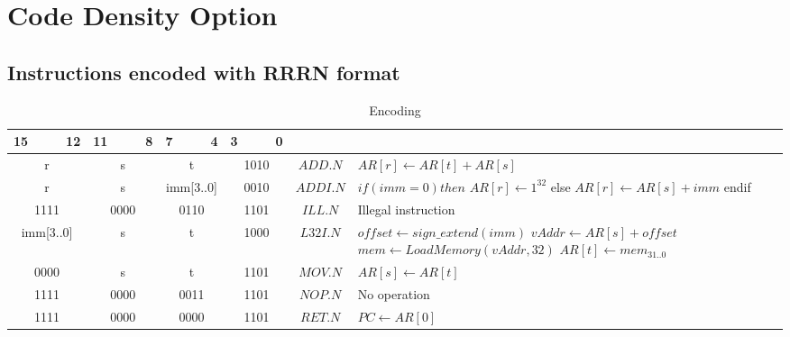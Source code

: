 \section{Code Density Option}
\subsection{Instructions encoded with RRRN format}
\begin{smalltables}
\begin{longtable}{llllllllllllllll  p{1cm}  p{7cm} | }
	\caption{Encoding\label{long}}\\
	15 & & & 12 & 11 & & & 8 & 7 & & & 4 & 3 & & & 0 & & \multicolumn{1}{c}{}\\
	\hline
	\endhead
	\multicolumn{4}{|c|}{r} & \multicolumn{4}{c|}{s} & \multicolumn{4}{c|}{t} & \multicolumn{4}{c|}{1010} & \multicolumn{1}{c|}{$ADD.N$} & $AR[r] \leftarrow AR[t] + AR[s]$ \\ \hline
	\multicolumn{4}{|c|}{r} & \multicolumn{4}{c|}{s} & \multicolumn{4}{c|}{imm[3..0]} & \multicolumn{4}{c|}{0010} & \multicolumn{1}{c|}{$ADDI.N$} & $if (imm = 0) then$ \newline $AR[r] \leftarrow 1^{32}$ \newline else \newline $AR[r] \leftarrow AR[s] + imm$ \newline endif \\ \hline
	\multicolumn{4}{|c|}{1111} & \multicolumn{4}{c|}{0000} & \multicolumn{4}{c|}{0110} & \multicolumn{4}{c|}{1101} & \multicolumn{1}{c|}{$ILL.N$} & Illegal instruction\\ \hline
	\multicolumn{4}{|c|}{imm[3..0]} & \multicolumn{4}{c|}{s} & \multicolumn{4}{c|}{t} & \multicolumn{4}{c|}{1000} & \multicolumn{1}{c|}{$L32I.N$} & $offset \leftarrow sign\_extend(imm)$ \newline $vAddr \leftarrow AR[s] + offset$ \newline $mem \leftarrow LoadMemory(vAddr, 32)$ \newline $AR[t] \leftarrow mem_{31..0}$\\ \hline
	\multicolumn{4}{|c|}{0000} & \multicolumn{4}{c|}{s} & \multicolumn{4}{c|}{t} & \multicolumn{4}{c|}{1101} & \multicolumn{1}{c|}{$MOV.N$} &  $AR[s] \leftarrow AR[t]$ \\ \hline
	\multicolumn{4}{|c|}{1111} & \multicolumn{4}{c|}{0000} & \multicolumn{4}{c|}{0011} & \multicolumn{4}{c|}{1101} & \multicolumn{1}{c|}{$NOP.N$} & No operation \\ \hline
	\multicolumn{4}{|c|}{1111} & \multicolumn{4}{c|}{0000} & \multicolumn{4}{c|}{0000} & \multicolumn{4}{c|}{1101} & \multicolumn{1}{c|}{$RET.N$} & $PC \leftarrow AR[0]$ \\ \hline

\end{longtable}
\end{smalltables}
